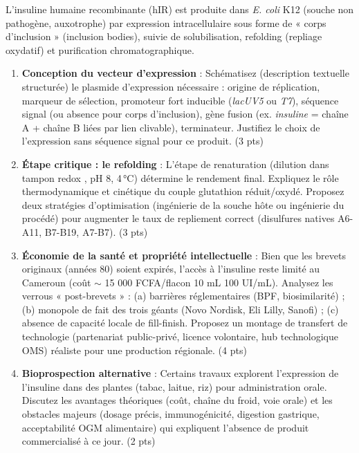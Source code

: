 \documentclass[11pt]{article}
\begin{document}
\begin{exercice}
L'insuline humaine recombinante (hIR) est produite dans \textit{E. coli} K12 (souche non pathogène, auxotrophe) par expression intracellulaire sous forme de « corps d'inclusion » (inclusion bodies), suivie de solubilisation, refolding (repliage oxydatif) et purification chromatographique.

\begin{enumerate}
    \item \textbf{Conception du vecteur d'expression} : Schématisez (description textuelle structurée) le plasmide d'expression nécessaire : origine de réplication, marqueur de sélection, promoteur fort inducible (\textit{lacUV5} ou \textit{T7}), séquence signal (ou absence pour corps d'inclusion), gène fusion (ex. \textit{insuline} = chaîne A + chaîne B liées par lien clivable), terminateur. Justifiez le choix de l'expression sans séquence signal pour ce produit. (3 pts)
    \item \textbf{Étape critique : le refolding} : L'étape de renaturation (dilution dans tampon redox , pH 8, 4\,°C) détermine le rendement final. Expliquez le rôle thermodynamique et cinétique du couple glutathion réduit/oxydé. Proposez deux stratégies d'optimisation (ingénierie de la souche hôte ou ingénierie du procédé) pour augmenter le taux de repliement correct (disulfures natives A6-A11, B7-B19, A7-B7). (3 pts)
    \item \textbf{Économie de la santé et propriété intellectuelle} : Bien que les brevets originaux (années 80) soient expirés, l'accès à l'insuline reste limité au Cameroun (coût $\sim$ 15 000 FCFA/flacon 10 mL 100 UI/mL). Analysez les verrous « post-brevets » : (a) barrières réglementaires (BPF, biosimilarité) ; (b) monopole de fait des trois géants (Novo Nordisk, Eli Lilly, Sanofi) ; (c) absence de capacité locale de fill-finish. Proposez un montage de transfert de technologie (partenariat public-privé, licence volontaire, hub technologique OMS) réaliste pour une production régionale. (4 pts)
    \item \textbf{Bioprospection alternative} : Certains travaux explorent l'expression de l'insuline dans des plantes (tabac, laitue, riz) pour administration orale. Discutez les avantages théoriques (coût, chaîne du froid, voie orale) et les obstacles majeurs (dosage précis, immunogénicité, digestion gastrique, acceptabilité OGM alimentaire) qui expliquent l'absence de produit commercialisé à ce jour. (2 pts)
\end{enumerate}
\end{exercice}
\end{document}
